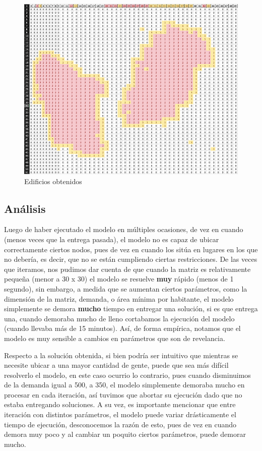 \documentclass[letterpaper]{article}
\begin{document}
\begin{figure}[h!]
	\centering
    \includegraphics[scale=0.3]{DEFINITIVO.png}
    \caption{Edificios obtenidos}
\end{figure} 


\subsection{Análisis}
Luego de haber ejecutado el modelo en múltiples ocasiones, de vez en cuando (menos veces que la entrega pasada), el modelo no es capaz de ubicar correctamente ciertos nodos, pues de vez en cuando
los sitúa en lugares en los que no debería, es decir, que no se están cumpliendo ciertas restricciones. De las veces que iteramos, nos pudimos dar cuenta de que cuando la matriz es relativamente pequeña (menor a 30 x 30)
el modelo se resuelve \textbf{muy} rápido (menos de 1 segundo), sin embargo, a medida que se aumentan ciertos parámetros, como la dimensión de la matriz, demanda, o área mínima por habitante, el modelo simplemente
se demora \textbf{mucho} tiempo en entregar una solución, si es que entrega una, cuando demoraba mucho de lleno cortabamos la ejecución del modelo (cuando llevaba más de 15 minutos). Así, de forma empírica, 
notamos que el modelo es muy sensible a cambios en parámetros que son de revelancia. \newline \newline

Respecto a la solución obtenida, si bien podría ser intuitivo que mientras se necesite ubicar a una mayor cantidad de gente, puede que sea más difícil resolverlo el modelo, en este caso ocurrio lo contrario,
pues cuando disminuimos de la demanda igual a 500, a 350, el modelo simplemente demoraba mucho en procesar en cada iteración, así tuvimos que abortar su ejecución dado que no estaba entregando soluciones. A su vez,
es importante mencionar que entre iteración con distintos parámetros, el modelo puede variar drásticamente el tiempo de ejecución, desconocemos la razón de esto, pues de vez en cuando demora muy poco y al cambiar
un poquito ciertos parámetros, puede demorar mucho.
\end{document}
